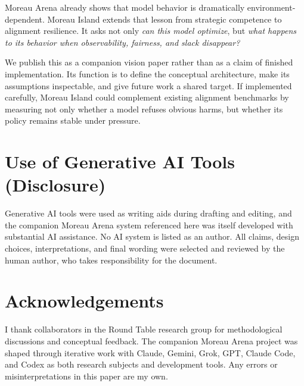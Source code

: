 \documentclass[11pt]{article}
\begin{document}
Moreau Arena already shows that model behavior is dramatically environment-dependent.
Moreau Island extends that lesson from strategic competence to alignment resilience.
It asks not only \emph{can this model optimize}, but \emph{what happens to its behavior when observability, fairness, and slack disappear?}

We publish this as a companion vision paper rather than as a claim of finished implementation.
Its function is to define the conceptual architecture, make its assumptions inspectable, and give future work a shared target.
If implemented carefully, Moreau Island could complement existing alignment benchmarks by measuring not only whether a model refuses obvious harms, but whether its policy remains stable under pressure.

\section*{Use of Generative AI Tools (Disclosure)}
Generative AI tools were used as writing aids during drafting and editing, and the companion Moreau Arena system referenced here was itself developed with substantial AI assistance.
No AI system is listed as an author.
All claims, design choices, interpretations, and final wording were selected and reviewed by the human author, who takes responsibility for the document.

\section*{Acknowledgements}
I thank collaborators in the Round Table research group for methodological discussions and conceptual feedback.
The companion Moreau Arena project was shaped through iterative work with Claude, Gemini, Grok, GPT, Claude Code, and Codex as both research subjects and development tools.
Any errors or misinterpretations in this paper are my own.
\end{document}
